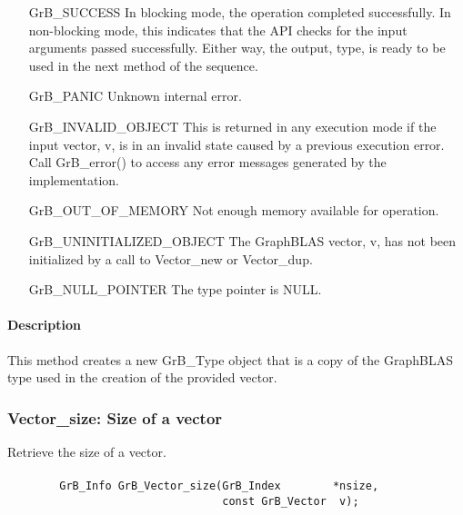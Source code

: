 \begin{itemize}[leftmargin=2.1in]
    \item[{\sf GrB\_SUCCESS}]         In blocking mode, the operation completed
    successfully. In non-blocking mode, this indicates that the API checks 
    for the input arguments passed successfully. Either way, the output,
    {\sf type}, is ready to be used in the next method of the sequence.

    \item[{\sf GrB\_PANIC}]           Unknown internal error.
    
    \item[{\sf GrB\_INVALID\_OBJECT}] This is returned in any execution mode 
    if the input vector, {\sf v}, is in an invalid 
    state caused by a previous execution error.  Call {\sf GrB\_error()} to access 
    any error messages generated by the implementation.

    \item[{\sf GrB\_OUT\_OF\_MEMORY}] Not enough memory available for operation.
    
    \item[{\sf GrB\_UNINITIALIZED\_OBJECT}]  The GraphBLAS vector, {\sf v}, has 
    not been initialized by a call to {\sf Vector\_new} or {\sf Vector\_dup}.
    
    \item[{\sf GrB\_NULL\_POINTER}]  The {\sf type} pointer is {\sf NULL}.
\end{itemize}

\paragraph{Description}

This method creates a new {\sf GrB\_Type} object that is a copy of the GraphBLAS 
type used in the creation of the provided vector.

\subsubsection{{\sf Vector\_size}: Size of a vector}

Retrieve the size of a vector.

\paragraph{\syntax}

\begin{verbatim}
        GrB_Info GrB_Vector_size(GrB_Index        *nsize,
                                 const GrB_Vector  v);
\end{verbatim}

